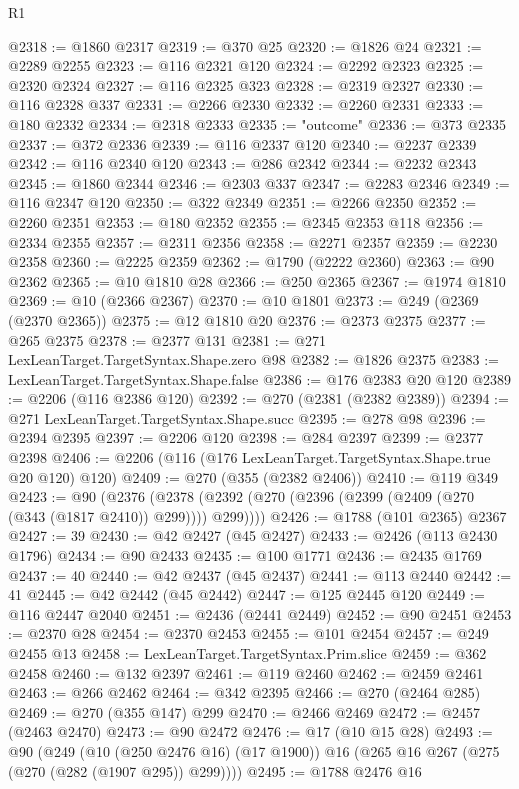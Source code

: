 \begin{lexlean}{R1}
\begin{coremodule}
@2318 := @1860 @2317
@2319 := @370 @25
@2320 := @1826 @24
@2321 := @2289 @2255
@2323 := @116 @2321 @120
@2324 := @2292 @2323
@2325 := @2320 @2324
@2327 := @116 @2325 @323
@2328 := @2319 @2327
@2330 := @116 @2328 @337
@2331 := @2266 @2330
@2332 := @2260 @2331
@2333 := @180 @2332
@2334 := @2318 @2333
@2335 := "outcome"
@2336 := @373 @2335
@2337 := @372 @2336
@2339 := @116 @2337 @120
@2340 := @2237 @2339
@2342 := @116 @2340 @120
@2343 := @286 @2342
@2344 := @2232 @2343
@2345 := @1860 @2344
@2346 := @2303 @337
@2347 := @2283 @2346
@2349 := @116 @2347 @120
@2350 := @322 @2349
@2351 := @2266 @2350
@2352 := @2260 @2351
@2353 := @180 @2352
@2355 := @2345 @2353 @118
@2356 := @2334 @2355
@2357 := @2311 @2356
@2358 := @2271 @2357
@2359 := @2230 @2358
@2360 := @2225 @2359
@2362 := @1790 (@2222 @2360)
@2363 := @90 @2362
@2365 := @10 @1810 @28
@2366 := @250 @2365
@2367 := @1974 @1810
@2369 := @10 (@2366 @2367)
@2370 := @10 @1801
@2373 := @249 (@2369 (@2370 @2365))
@2375 := @12 @1810 @20
@2376 := @2373 @2375
@2377 := @265 @2375
@2378 := @2377 @131
@2381 := @271 LexLeanTarget.TargetSyntax.Shape.zero @98
@2382 := @1826 @2375
@2383 := LexLeanTarget.TargetSyntax.Shape.false
@2386 := @176 @2383 @20 @120
@2389 := @2206 (@116 @2386 @120)
@2392 := @270 (@2381 (@2382 @2389))
@2394 := @271 LexLeanTarget.TargetSyntax.Shape.succ
@2395 := @278 @98
@2396 := @2394 @2395
@2397 := @2206 @120
@2398 := @284 @2397
@2399 := @2377 @2398
@2406 := @2206 (@116 (@176 LexLeanTarget.TargetSyntax.Shape.true @20 @120) @120)
@2409 := @270 (@355 (@2382 @2406))
@2410 := @119 @349
@2423 := @90
    (@2376 (@2378 (@2392 (@270 (@2396 (@2399 (@2409 (@270 (@343 (@1817 @2410)) @299)))) @299))))
@2426 := @1788 (@101 @2365) @2367
@2427 := 39
@2430 := @42 @2427 (@45 @2427)
@2433 := @2426 (@113 @2430 @1796)
@2434 := @90 @2433
@2435 := @100 @1771
@2436 := @2435 @1769
@2437 := 40
@2440 := @42 @2437 (@45 @2437)
@2441 := @113 @2440
@2442 := 41
@2445 := @42 @2442 (@45 @2442)
@2447 := @125 @2445 @120
@2449 := @116 @2447 @2040
@2451 := @2436 (@2441 @2449)
@2452 := @90 @2451
@2453 := @2370 @28
@2454 := @2370 @2453
@2455 := @101 @2454
@2457 := @249 @2455 @13
@2458 := LexLeanTarget.TargetSyntax.Prim.slice
@2459 := @362 @2458
@2460 := @132 @2397
@2461 := @119 @2460
@2462 := @2459 @2461
@2463 := @266 @2462
@2464 := @342 @2395
@2466 := @270 (@2464 @285)
@2469 := @270 (@355 @147) @299
@2470 := @2466 @2469
@2472 := @2457 (@2463 @2470)
@2473 := @90 @2472
@2476 := @17 (@10 @15 @28)
@2493 := @90
    (@249
      (@10 (@250 @2476 @16) (@17 @1900))
      @16
      (@265 @16 @267 (@275 (@270 (@282 (@1907 @295)) @299))))
@2495 := @1788 @2476 @16

\end{coremodule}
\end{lexlean}
